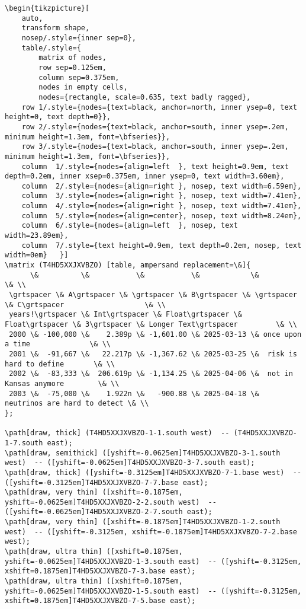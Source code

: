 \documentclass[
  12pt,
  a4paper,
  DIV=11,
  numbers=noendperiod]{scrartcl}
\newcommand{\grtspacer}{\vphantom{lp}}
\begin{document}
\begin{verbatim}
\begin{tikzpicture}[
    auto,
    transform shape,
    nosep/.style={inner sep=0},
    table/.style={
        matrix of nodes,
        row sep=0.125em,
        column sep=0.375em,
        nodes in empty cells,
        nodes={rectangle, scale=0.635, text badly ragged},
    row 1/.style={nodes={text=black, anchor=north, inner ysep=0, text height=0, text depth=0}},
    row 2/.style={nodes={text=black, anchor=south, inner ysep=.2em, minimum height=1.3em, font=\bfseries}},
    row 3/.style={nodes={text=black, anchor=south, inner ysep=.2em, minimum height=1.3em, font=\bfseries}},
    column  1/.style={nodes={align=left  }, text height=0.9em, text depth=0.2em, inner xsep=0.375em, inner ysep=0, text width=3.60em},
    column  2/.style={nodes={align=right }, nosep, text width=6.59em},
    column  3/.style={nodes={align=right }, nosep, text width=7.41em},
    column  4/.style={nodes={align=right }, nosep, text width=7.41em},
    column  5/.style={nodes={align=center}, nosep, text width=8.24em},
    column  6/.style={nodes={align=left  }, nosep, text width=23.89em},
    column  7/.style={text height=0.9em, text depth=0.2em, nosep, text width=0em}   }]
\matrix (T4HD5XXJXVBZO) [table, ampersand replacement=\&]{
      \&          \&           \&           \&            \&                               \& \\
 \grtspacer \& A\grtspacer \& \grtspacer \& B\grtspacer \& \grtspacer \& C\grtspacer                   \& \\
 years!\grtspacer \& Int\grtspacer \& Float\grtspacer \& Float\grtspacer \& 3\grtspacer \& Longer Text\grtspacer         \& \\
 2000 \& -100,000 \&    2.389p \& -1,601.00 \& 2025-03-13 \& once upon a time              \& \\
 2001 \&  -91,667 \&   22.217p \& -1,367.62 \& 2025-03-25 \&  risk is hard to define       \& \\
 2002 \&  -83,333 \&  206.619p \& -1,134.25 \& 2025-04-06 \&  not in Kansas anymore        \& \\
 2003 \&  -75,000 \&    1.922n \&   -900.88 \& 2025-04-18 \&  neutrinos are hard to detect \& \\
};

\path[draw, thick] (T4HD5XXJXVBZO-1-1.south west)  -- (T4HD5XXJXVBZO-1-7.south east);
\path[draw, semithick] ([yshift=-0.0625em]T4HD5XXJXVBZO-3-1.south west)  -- ([yshift=-0.0625em]T4HD5XXJXVBZO-3-7.south east);
\path[draw, thick] ([yshift=-0.3125em]T4HD5XXJXVBZO-7-1.base west)  -- ([yshift=-0.3125em]T4HD5XXJXVBZO-7-7.base east);
\path[draw, very thin] ([xshift=-0.1875em, yshift=-0.0625em]T4HD5XXJXVBZO-2-2.south west)  -- ([yshift=-0.0625em]T4HD5XXJXVBZO-2-7.south east);
\path[draw, very thin] ([xshift=-0.1875em]T4HD5XXJXVBZO-1-2.south west)  -- ([yshift=-0.3125em, xshift=-0.1875em]T4HD5XXJXVBZO-7-2.base west);
\path[draw, ultra thin] ([xshift=0.1875em, yshift=-0.0625em]T4HD5XXJXVBZO-1-3.south east)  -- ([yshift=-0.3125em, xshift=0.1875em]T4HD5XXJXVBZO-7-3.base east);
\path[draw, ultra thin] ([xshift=0.1875em, yshift=-0.0625em]T4HD5XXJXVBZO-1-5.south east)  -- ([yshift=-0.3125em, xshift=0.1875em]T4HD5XXJXVBZO-7-5.base east);




\end{verbatim}
\end{document}
